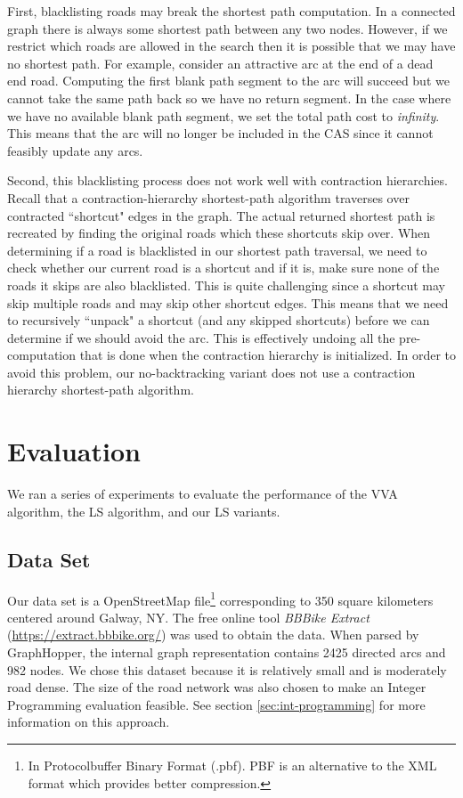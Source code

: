 \documentclass[11pt]{article}
\begin{document}
First, blacklisting roads may break the shortest path computation. In a connected graph there is always some shortest path between any two nodes. However, if we restrict which roads are allowed in the search then it is possible that we may have no shortest path. For example, consider an attractive arc at the end of a dead end road. Computing the first blank path segment to the arc will succeed but we cannot take the same path back so we have no return segment. In the case where we have no available blank path segment, we set the total path cost to \emph{infinity}. This means that the arc will no longer be included in the CAS since it cannot feasibly update any arcs. 

Second, this blacklisting process does not work well with contraction hierarchies. Recall that a contraction-hierarchy shortest-path algorithm traverses over contracted ``shortcut" edges in the graph. The actual returned shortest path is recreated by finding the original roads which these shortcuts skip over. When determining if a road is blacklisted in our shortest path traversal, we need to check whether our current road is a shortcut and if it is, make sure none of the roads it skips are also blacklisted. This is quite challenging since a shortcut may skip multiple roads and may skip other shortcut edges. This means that we need to recursively ``unpack" a shortcut (and any skipped shortcuts)  before we can determine if we should avoid the arc. This is effectively undoing all the pre-computation that is done when the contraction hierarchy is initialized. In order to avoid this problem, our no-backtracking variant does not use a contraction hierarchy shortest-path algorithm.


\section{Evaluation}
We ran a series of experiments to evaluate the performance of the VVA algorithm, the LS algorithm, and our LS variants. 

\subsection{Data Set}
Our data set is a OpenStreetMap file\footnote{In Protocolbuffer Binary Format (.pbf). PBF is an alternative to the XML format which provides better compression.} corresponding to 350 square kilometers centered around Galway, NY. The free online tool \emph{BBBike Extract} (\url{https://extract.bbbike.org/}) was used to obtain the data. When parsed by GraphHopper, the internal graph representation contains 2425 directed arcs and 982 nodes. We chose this dataset because it is relatively small and is moderately road dense. The size of the road network was also chosen to make an Integer Programming evaluation feasible. See section \ref{sec:int-programming} for more information on this approach.
\end{document}
